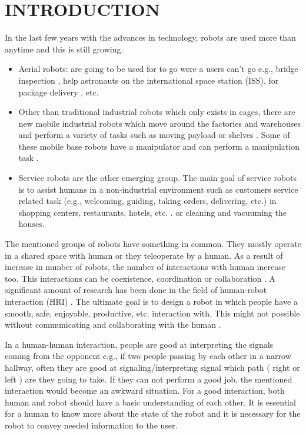 \documentclass[letterpaper, 10 pt, conference]{ieeeconf}  %
\begin{document}
\section{INTRODUCTION}
In the last few years with the advances in technology, robots are used more than anytime and this is still growing.
\begin{itemize}
\item Aerial robots: are going to be used for to go were a users can't go e.g., bridge inspection \cite{chan2015towards}, help astronauts on the international space station (ISS)\cite{bualat2015astrobee}, for package delivery \cite{d2014guest}, etc. 
\item Other than traditional industrial robots which only exists in cages, there are new mobile industrial robots which move around the factories and warehouses and perform a variety of tasks such as moving payload or shelves \cite{wurman2008coordinating}. Some of these mobile base robots have a manipulator and can perform a manipulation task \cite{datta2008development, hvilshoj2011little}. 

\item Service robots are the other emerging group. The main goal of service robots is to assist humans in a non-industrial environment such as customers service related task (e.g., welcoming, guiding, taking orders, delivering, etc.) in shopping centers, restaurants, hotels, etc. \cite{acosta2006design, datta2011pilot, kanda2009affective, osawa2017real, zalama2014sacarino}. or cleaning and vacuuming the houses\cite{forlizzi2006service}.

\end{itemize}

The mentioned groups of robots have something in common. They mostly operate in a shared space with human or they teleoperate by a human. As a result of increase in number of robots, the number of interactions with human increase too. This interactions can be coexistence, coordination or collaboration \cite{cha2018survey}. A significant amount of research has been done in the field of human-robot interaction (HRI) \cite{goodrich2008human}. The ultimate goal is to design a robot in which people have a smooth, safe, enjoyable, productive, etc. interaction with. This might not possible without communicating and collaborating with the human \cite{cha2018survey, khatib1999robots}. 

In a human-human interaction, people are good at interpreting the signals coming from the opponent e.g., if two people passing by each other in a narrow hallway, often they are good at signaling/interpreting signal which path ( right or left ) are they going to take. If they can not perform a good job, the mentioned interaction would become an awkward situation. For a good interaction, both human and robot should have a basic understanding of each other. It is essential for a human to know more about the state of the robot and it is necessary for the robot to convey needed information to the user.
\end{document}
